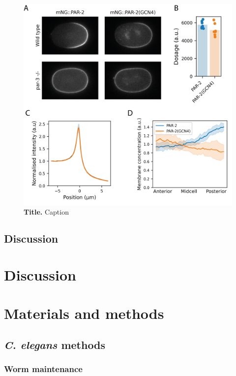 \documentclass[12pt]{"report"}
\newcommand{\mycaption}[2]{\caption[#1]{\textbf{#1.} #2}}
\begin{document}
\begin{figure}[!h]
\includegraphics[scale=0.95]{gcn4_par3mut}
\setlength{\abovecaptionskip}{20pt}
\centering
\mycaption{Title}{Caption}
\label{fig:gcn4_par3mut}
\end{figure}

\section{Discussion}



\clearpage
\chapter{Discussion}


\clearpage
\chapter{Materials and methods}

\section{\textit{C. elegans} methods}

\subsection{Worm maintenance}
\end{document}
